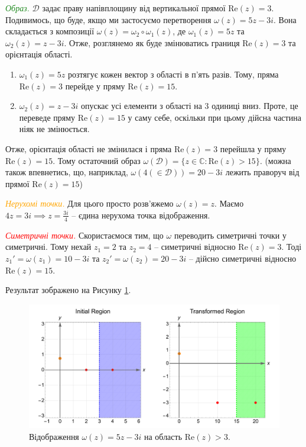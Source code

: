 \documentclass[oneside,solution]{karazin-complan-assign}
\begin{document}
\textcolor{ForestGreen}{\textit{Образ.}} $\mathcal{D}$ задає праву напівплощину від вертикальної прямої $\text{Re}(z)=3$. Подивимось, що буде, якщо ми застосуємо перетворення $\omega(z) = 5z - 3i$. Вона складається з композиції $\omega(z) = \omega_2 \circ \omega_1(z)$, де $\omega_1(z) = 5z$ та $\omega_2(z) = z - 3i$. Отже, розглянемо як буде змінюватись границя $\text{Re}(z) = 3$ та орієнтація області.
\begin{enumerate}
    \item $\omega_1(z)=5z$ розтягує кожен вектор з області в п'ять разів. Тому, пряма $\text{Re}(z)=3$ перейде у пряму $\text{Re}(z)=15$. 
    \item $\omega_2(z) = z-3i$ опускає усі елементи з області на $3$ одиниці вниз. Проте, це переведе пряму $\text{Re}(z) = 15$ у саму себе, оскільки при цьому дійсна частина ніяк не змінюється. 
\end{enumerate}

Отже, орієнтація області не змінилася і пряма $\text{Re}(z)=3$ перейшла у пряму $\text{Re}(z)=15$. Тому остаточний образ $\omega(\mathcal{D}) = \{z \in \mathbb{C}: \text{Re}(z) > 15\}$. (можна також впевнетись, що, наприклад, $\omega(4 (\in \mathcal{D}))=20-3i$ лежить праворуч від прямої $\text{Re}(z)=15$)

\textcolor{orange}{\textit{Нерухомі точки.}} Для цього просто розв'яжемо $\omega(z) = z$. Маємо $4z = 3i \implies z = \frac{3i}{4}$ -- єдина нерухома точка відображення. 

\textcolor{red}{\textit{Симетричні точки.}} Скористаємося тим, що $\omega$ переводить симетричні точки у симетричні. Тому нехай $z_1=2$ та $z_2=4$ -- симетричні відносно $\text{Re}(z)=3$. Тоді $z_1'=\omega(z_1)=10-3i$ та $z_2'=\omega(z_2)=20-3i$ -- дійсно симетричні відносно $\text{Re}(z)=15$.

Результат зображено на Рисунку \ref{fig:1(a)}.

\begin{figure}
    \centering
    \includegraphics[width=\textwidth]{images/hw_4/problem_1(a).pdf}
    \caption{Відображення $\omega(z)=5z-3i$ на область $\text{Re}(z)>3$.}
    \label{fig:1(a)}
\end{figure}
\end{document}
